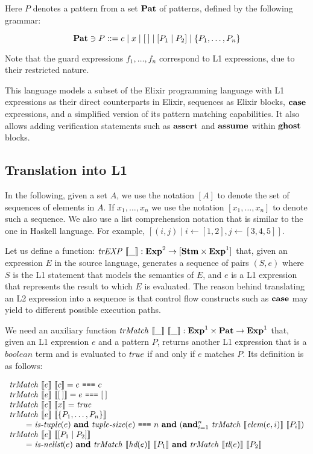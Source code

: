 Here $P$ denotes a pattern from a set $\mathbf{Pat}$ of patterns, defined by the 
following grammar:

\[
\mathbf{Pat} \ni P ::= c \mid x \mid [\:] \mid [P_1 \mid P_2] \mid \{ P_1, \ldots, P_n \}
\]

Note that the guard expressions $f_1, \ldots, f_n$ correspond to L1 expressions,
due to their restricted nature.

This language models a subset of the Elixir programming language with L1
expressions as their direct counterparts in Elixir, sequences as Elixir blocks,
$\textbf{case}$ expressions, and a simplified version of its pattern matching
capabilities.  It also allows adding verification statements such as $\textbf{assert}$
and $\textbf{assume}$ within $\textbf{ghost}$ blocks.

\subsection{Translation into L1}

In the following, given a set $A$, we use the notation $[A]$ to denote the set
of sequences of elements in $A$. If $x_1, \ldots, x_n$ we use the notation 
$[x_1, \ldots, x_n]$ to denote such a sequence. We also use a list comprehension
notation that is similar to the one in Haskell language. For example, $[(i, j)
\mid i \leftarrow [1, 2], j \leftarrow [3, 4, 5]]$.

Let us define a function: $\mathit{trEXP}~\llbracket\_\rrbracket : \mathbf{Exp}^{2} \rightarrow [\mathbf{Stm} \times
\mathbf{Exp}^{1}]$ that, given an expression $E$ in the source language, generates a
sequence of pairs $(S, e)$ where $S$ is the L1 statement that models the
semantics of $E$, and $e$ is a L1 expression that represents the result to which
$E$ is evaluated. The reason behind translating an L2 expression into a sequence
is that control flow constructs such as $\textbf{case}$ may yield to different possible
execution paths. 

We need an auxiliary function $\mathit{trMatch}~\llbracket\_\rrbracket~\llbracket\_\rrbracket : \mathbf{Exp}^{1} \times \mathbf{Pat}
\rightarrow \mathbf{Exp}^{1}$ that, given an L1 expression $e$ and a pattern $P$, returns
another L1 expression that is a $\mathit{boolean}$ term and is evaluated to
$\mathit{true}$ if and only if $e$ matches $P$. Its definition is as follows:

\[
\begin{array}{l}
\mathit{trMatch}~\llbracket e\rrbracket~\llbracket c\rrbracket = e~\texttt{===}~{c}\\
\mathit{trMatch}~\llbracket e\rrbracket~\llbracket[\:]\rrbracket = e~\texttt{===}~{[\:]} \\
\mathit{trMatch}~\llbracket e\rrbracket~\llbracket x\rrbracket = \mathit{true}\\
\mathit{trMatch}~\llbracket e\rrbracket~\llbracket\{P_1,\ldots,P_n\}\rrbracket\\
\qquad = \textit{is-tuple}(e)~\mathbf{and}~\textit{tuple-size}(e)~\texttt{===}~n~\mathbf{and}~(\mathbf{and}_{i=1}^n~\mathit{trMatch}~\llbracket\textit{elem}(e, i)\rrbracket~\llbracket P_i\rrbracket)\\
\mathit{trMatch}~\llbracket e\rrbracket~\llbracket[P_1\mid P_2]\rrbracket\\
\qquad = \textit{is-nelist}(e)~\mathbf{and}~\mathit{trMatch}~\llbracket\textit{hd}(e)\rrbracket~\llbracket P_1\rrbracket~\mathbf{and}~\mathit{trMatch}~\llbracket\textit{tl}(e)\rrbracket~\llbracket P_2\rrbracket
\end{array}
\]

